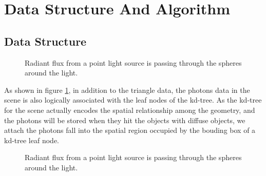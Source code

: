 \section{Data Structure And Algorithm} 

\subsection{Data Structure}

\begin{figure}[htp] 
    \centering 
    \renewcommand{\thefigure}{\thechapter.\arabic{figure}}
    \caption[]{Radiant flux from a point light source is passing through the spheres around the light.}
    \label{fig:kd_leaf_photons} 
\end{figure}  

As shown in figure \ref{fig:kd_leaf_photons}, in addition to the triangle data, the photons data in the scene is also logically associated with the leaf nodes of the kd-tree. As the kd-tree for the scene actually encodes the spatial relationship among the geometry, and the photons will be stored when they hit the objects with diffuse objects, we attach the photons fall into the spatial region occupied by the bouding box of a kd-tree leaf node. 

\begin{figure}[htp] 
    \centering 
    \renewcommand{\thefigure}{\thechapter.\arabic{figure}}
    \caption[]{Radiant flux from a point light source is passing through the spheres around the light.}
    \label{fig:kd_leaf_photons_2} 
\end{figure}  

